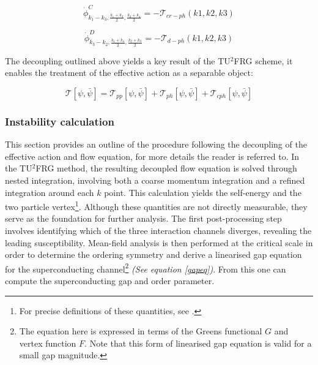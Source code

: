 \documentclass[11pt]{article}
\begin{document}
\begin{equation}\label{con2}
    \dot{\phi}^{C}_{k_1 - k_3, \frac{k_1 +k_3}{2}, \frac{k_2+k_4}{2}} = - \mathcal{T}_{cr-ph}(k1,k2,k3)
\end{equation}

\begin{equation}\label{con}
    \dot{\phi}^{D}_{k_3- k_2, \frac{k_1 + k_4}{2}, \frac{k_2+k_3}{2}} = - \mathcal{T}_{d-ph}(k1,k2,k3)
\end{equation}

\noindent The decoupling outlined above yields a key result of the TU$^2$FRG scheme, it 
enables the treatment of the effective action as a separable object:

\begin{equation}
    \mathcal{T}[\psi, \bar{\psi}] = \mathcal{T}_{pp}[\psi, \bar{\psi}] + \mathcal{T}_{ph}[\psi, \bar{\psi}] + \mathcal{T}_{cph}[\psi, \bar{\psi}]
\end{equation}

\medskip





\subsubsection{Instability calculation}

This section provides an outline of the procedure following the decoupling of the effective action and flow equation, for more details the reader is referred to\cite{profe2023functional}. 
In the TU$^2$FRG method, the resulting decoupled flow equation is solved through nested integration, involving both a coarse momentum integration and a
refined integration around each $k$ point.  This calculation yields the self-energy and the two particle vertex\footnote{For precise definitions of these quantities, see \cite{metzner2012functional}.}.
Although these quantities are not directly measurable, they serve as the foundation for further analysis. The first post-processing step involves
identifying which of the three interaction channels diverges, revealing the leading susceptibility. Mean-field analysis\cite{reiss2007renormalized} is then performed at the critical scale in order to determine the ordering symmetry 
and derive a linearised gap equation for the superconducting channel\footnote{The equation here is expressed in terms of the Greens functional $G$ and vertex function $F$. Note that this form of linearised gap equation is valid for a small gap magnitude. }
\textit{(See equation \ref{gapeq})}\cite{profe2023functional}. From this one can compute 
the superconducting gap and order parameter.
\end{document}
